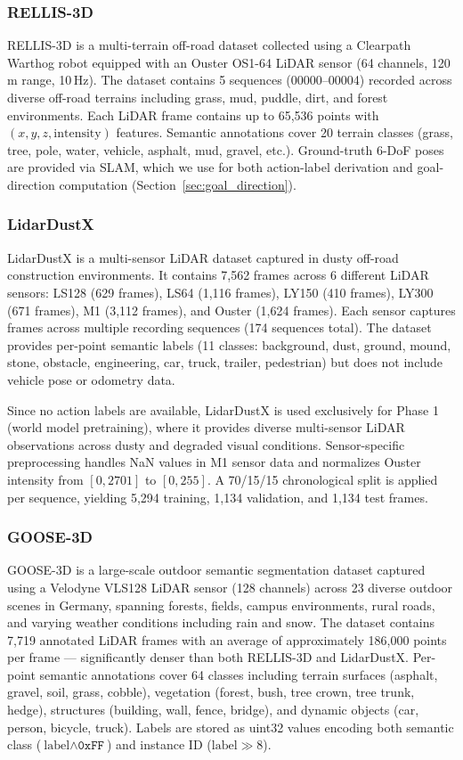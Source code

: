 \documentclass[sensors,article,submit,pdftex,moreauthors]{Definitions/mdpi}
\begin{document}
\subsubsection{RELLIS-3D}
RELLIS-3D \cite{jiang2021} is a multi-terrain off-road dataset collected using a Clearpath Warthog robot equipped with an Ouster OS1-64 LiDAR sensor (64 channels, 120\,m range, 10\,Hz). The dataset contains 5 sequences (00000--00004) recorded across diverse off-road terrains including grass, mud, puddle, dirt, and forest environments. Each LiDAR frame contains up to 65,536 points with $(x, y, z, \text{intensity})$ features. Semantic annotations cover 20 terrain classes (grass, tree, pole, water, vehicle, asphalt, mud, gravel, etc.). Ground-truth 6-DoF poses are provided via SLAM, which we use for both action-label derivation and goal-direction computation (Section~\ref{sec:goal_direction}).

\subsubsection{LidarDustX}
LidarDustX \cite{lidardust} is a multi-sensor LiDAR dataset captured in dusty off-road construction environments. It contains 7,562 frames across 6 different LiDAR sensors: LS128 (629 frames), LS64 (1,116 frames), LY150 (410 frames), LY300 (671 frames), M1 (3,112 frames), and Ouster (1,624 frames). Each sensor captures frames across multiple recording sequences (174 sequences total). The dataset provides per-point semantic labels (11 classes: background, dust, ground, mound, stone, obstacle, engineering, car, truck, trailer, pedestrian) but does not include vehicle pose or odometry data.

Since no action labels are available, LidarDustX is used exclusively for Phase 1 (world model pretraining), where it provides diverse multi-sensor LiDAR observations across dusty and degraded visual conditions. Sensor-specific preprocessing handles NaN values in M1 sensor data and normalizes Ouster intensity from $[0, 2701]$ to $[0, 255]$. A 70/15/15 chronological split is applied per sequence, yielding 5,294 training, 1,134 validation, and 1,134 test frames.

\subsubsection{GOOSE-3D}
GOOSE-3D \cite{goose2024} is a large-scale outdoor semantic segmentation dataset captured using a Velodyne VLS128 LiDAR sensor (128 channels) across 23 diverse outdoor scenes in Germany, spanning forests, fields, campus environments, rural roads, and varying weather conditions including rain and snow. The dataset contains 7,719 annotated LiDAR frames with an average of approximately 186,000 points per frame --- significantly denser than both RELLIS-3D and LidarDustX. Per-point semantic annotations cover 64 classes including terrain surfaces (asphalt, gravel, soil, grass, cobble), vegetation (forest, bush, tree crown, tree trunk, hedge), structures (building, wall, fence, bridge), and dynamic objects (car, person, bicycle, truck). Labels are stored as uint32 values encoding both semantic class ($\text{label} \wedge \texttt{0xFF}$) and instance ID ($\text{label} \gg 8$).
\end{document}
